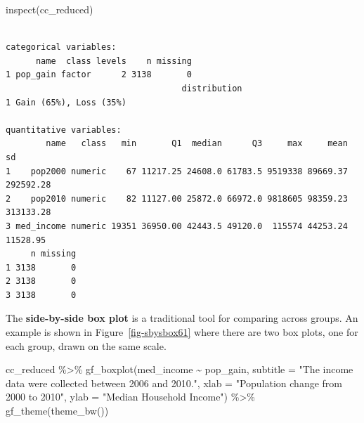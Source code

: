 \documentclass[
  letterpaper,
  DIV=11,
  numbers=noendperiod]{scrreprt}
\newenvironment{Shaded}{\begin{snugshade}}{\end{snugshade}}
\newcommand{\AttributeTok}[1]{\textcolor[rgb]{0.40,0.45,0.13}{#1}}
\newcommand{\FunctionTok}[1]{\textcolor[rgb]{0.28,0.35,0.67}{#1}}
\newcommand{\NormalTok}[1]{\textcolor[rgb]{0.00,0.23,0.31}{#1}}
\newcommand{\SpecialCharTok}[1]{\textcolor[rgb]{0.37,0.37,0.37}{#1}}
\newcommand{\StringTok}[1]{\textcolor[rgb]{0.13,0.47,0.30}{#1}}
\begin{document}
\begin{Shaded}
\begin{Highlighting}[]
\FunctionTok{inspect}\NormalTok{(cc\_reduced)}
\end{Highlighting}
\end{Shaded}

\begin{verbatim}

categorical variables:  
      name  class levels    n missing
1 pop_gain factor      2 3138       0
                                   distribution
1 Gain (65%), Loss (35%)                       

quantitative variables:  
        name   class   min       Q1  median      Q3     max     mean        sd
1    pop2000 numeric    67 11217.25 24608.0 61783.5 9519338 89669.37 292592.28
2    pop2010 numeric    82 11127.00 25872.0 66972.0 9818605 98359.23 313133.28
3 med_income numeric 19351 36950.00 42443.5 49120.0  115574 44253.24  11528.95
     n missing
1 3138       0
2 3138       0
3 3138       0
\end{verbatim}

The \textbf{side-by-side box plot} is a traditional tool for comparing
across groups. An example is shown in Figure~\ref{fig-sbysbox61} where
there are two box plots, one for each group, drawn on the same scale.

\begin{Shaded}
\begin{Highlighting}[]
\NormalTok{cc\_reduced }\SpecialCharTok{\%\textgreater{}\%}
  \FunctionTok{gf\_boxplot}\NormalTok{(med\_income }\SpecialCharTok{\textasciitilde{}}\NormalTok{ pop\_gain,}
             \AttributeTok{subtitle =} \StringTok{"The income data were collected between 2006 and 2010."}\NormalTok{,}
             \AttributeTok{xlab =} \StringTok{"Population change from 2000 to 2010"}\NormalTok{,}
             \AttributeTok{ylab =} \StringTok{"Median Household Income"}\NormalTok{) }\SpecialCharTok{\%\textgreater{}\%}
  \FunctionTok{gf\_theme}\NormalTok{(}\FunctionTok{theme\_bw}\NormalTok{())}
\end{Highlighting}
\end{Shaded}
\end{document}
